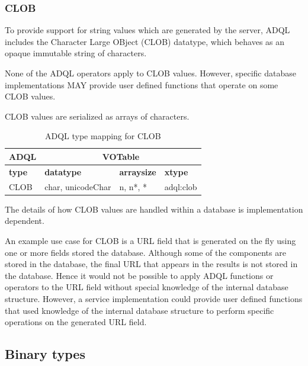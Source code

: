 \documentclass[11pt,a4paper]{ivoa}
\begin{document}
\subsubsection{CLOB}
\label{sec:types.character.clob}

To provide support for string values which are generated by the server,
ADQL includes the Character Large OBject (CLOB) datatype,
which behaves as an opaque immutable string of characters.

None of the ADQL operators apply to CLOB values.
However, specific database implementations MAY provide user
defined functions that operate on some CLOB values.

CLOB values are serialized as arrays of characters.

\begin{table}[th]\footnotesize
    \begin{tabular}
        {|p{}|p{}|p{}|p{}|}
        \hline

        \hline
        \multicolumn{1}{|c|}{\textbf{ADQL}} &
        \multicolumn{3}{|c|}{\textbf{VOTable}}
        \tabularnewline
        
        \hline
        \textbf{type} &
        \textbf{datatype} &
        \textbf{arraysize} &
        \textbf{xtype}
        \tabularnewline

        \hline
        CLOB &
        char, unicodeChar &
        n, n*, * &
        adql:clob
        \tabularnewline

        \hline
    \end{tabular}
    \caption{ADQL type mapping for CLOB}
    \label{table:types.character.clob}
\end{table}

The details of how CLOB values are handled within a
database is implementation dependent.

An example use case for CLOB is a URL field that is generated on the fly
using one or more fields stored the database.
Although some of the components are stored in the database, the final URL
that appears in the results is not stored in the database.
Hence it would not be possible to apply ADQL functions or operators to the
URL field without special knowledge of the internal database structure.
However, a service implementation could provide user defined functions
that used knowledge of the internal database structure to perform
specific operations on the generated URL field.

\subsection{Binary types}
\label{sec:types.binary}
\end{document}
